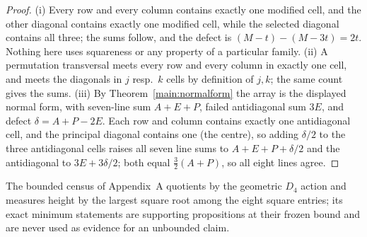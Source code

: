\begin{proof}
(i) Every row and every column contains exactly one modified cell, and the
other diagonal contains exactly one modified cell, while the selected
diagonal contains all three; the sums follow, and the defect is
$(M-t)-(M-3t)=2t$. Nothing here uses squareness or any property of a
particular family.
(ii) A permutation transversal meets every row and every column in exactly
one cell, and meets the diagonals in $j$ resp.\ $k$ cells by definition of
$j,k$; the same count gives the sums.
(iii) By Theorem~\ref{main:normalform} the
array is the displayed normal form, with seven-line sum $A+E+P$, failed
antidiagonal sum $3E$, and defect $\delta=A+P-2E$. Each row and column
contains exactly one antidiagonal cell, and the principal diagonal contains
one (the centre), so adding $\delta/2$ to the three antidiagonal cells
raises all seven line sums to $A+E+P+\delta/2$ and the antidiagonal to
$3E+3\delta/2$; both equal $\tfrac32(A+P)$, so all eight lines agree.
\end{proof}


\begin{remark}\label{rem:census}
The bounded census of Appendix~A quotients by the geometric $D_4$ action
and measures height by the largest square root among the eight square
entries; its exact minimum statements are supporting propositions at their
frozen bound and are never used as evidence for an unbounded claim.
\end{remark}

